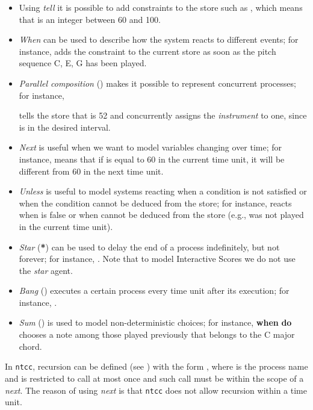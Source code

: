 \documentclass[english]{llncs}
\begin{document}
\begin{itemize}
\item Using \textit{tell} it is possible to add constraints to the store such as , which means that   is an integer between 60 and 100. 

\item \textit{When} can be used to describe how the system reacts to different events; for instance, 
      adds the constraint 
 to the current store as soon as the pitch sequence C, E, G  has been played.






\item \textit{Parallel composition} () makes it possible to represent concurrent processes; for instance,  
        
tells the store that  is 52 and concurrently assigns the \textit{instrument} to one, since  is in the desired interval.

\item \textit{Next} is useful
when we want to model variables changing over time; for instance,         means that if  is equal to 60 in the current time unit,  it will be different from 60 in the next time unit.

\item \textit{Unless} is useful to model systems reacting when a condition is not satisfied or when the condition cannot be deduced from
the store; for instance,       reacts when  is false or when  cannot be deduced from the store (e.g.,  was not played in the current time unit).


\item \textit{Star} (\textbf{*}) can be used to delay the end of a process indefinitely, but not forever; for instance,  . Note that to model Interactive Scores we do not use the \textit{star} agent.

\item \textit{Bang} ()  executes a certain process every time unit after its execution; for instance,  . 

\item \textit{Sum} (\textbf{}) is used to model non-deterministic choices; for instance,  \textbf{when} 
\textbf{do}   chooses a note among those played previously that belongs to the C major chord. 

\end{itemize}

In \texttt{ntcc}, recursion can be defined (see \cite{cc-chapter}) with the form , where  is the process name and
 is restricted to call  at most once and such call must be within the scope of a \textit{next}.
The reason of using \textit{next} is that \texttt{ntcc} does not allow 
recursion within a time unit.
\end{document}
